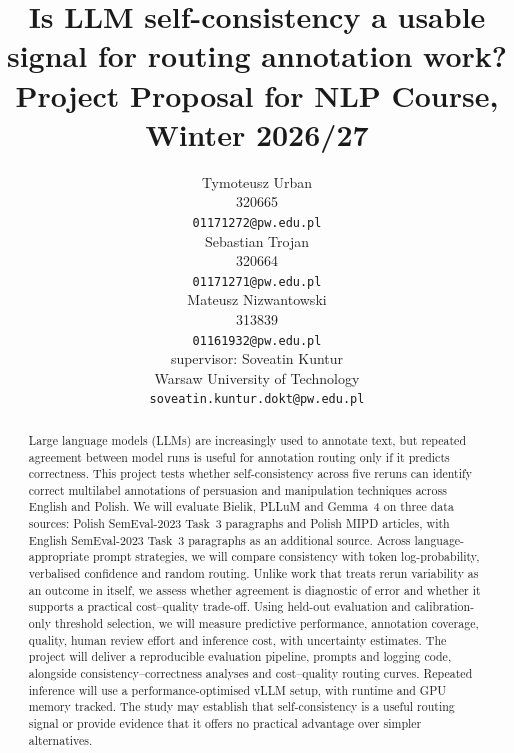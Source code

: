 \documentclass[11pt]{article}
\title{Is LLM self-consistency a usable signal for routing annotation work?\\Project Proposal for NLP Course, Winter 2026/27}
\author{Tymoteusz Urban \\
  320665 \\
  {\tt 01171272@pw.edu.pl} \\\And
  Sebastian Trojan \\
  320664 \\
  {\tt 01171271@pw.edu.pl} \\ \And
  Mateusz Nizwantowski \\
  313839 \\
  {\tt 01161932@pw.edu.pl} \\ \AND
  supervisor: Soveatin Kuntur\\
  Warsaw University of Technology \\
  {\tt soveatin.kuntur.dokt@pw.edu.pl}}
\date{}
\begin{document}
\maketitle

\begin{abstract}
  Large language models (LLMs) are increasingly used to annotate text, but repeated agreement between model runs is useful for annotation routing only if it predicts correctness. This project tests whether self-consistency across five reruns can identify correct multilabel annotations of persuasion and manipulation techniques across English and Polish. We will evaluate Bielik, PLLuM and Gemma~4 on three data sources: Polish SemEval-2023 Task~3 paragraphs and Polish MIPD articles, with English SemEval-2023 Task~3 paragraphs as an additional source. Across language-appropriate prompt strategies, we will compare consistency with token log-probability, verbalised confidence and random routing. Unlike work that treats rerun variability as an outcome in itself, we assess whether agreement is diagnostic of error and whether it supports a practical cost--quality trade-off. Using held-out evaluation and calibration-only threshold selection, we will measure predictive performance, annotation coverage, quality, human review effort and inference cost, with uncertainty estimates. The project will deliver a reproducible evaluation pipeline, prompts and logging code, alongside consistency--correctness analyses and cost--quality routing curves. Repeated inference will use a performance-optimised vLLM setup, with runtime and GPU memory tracked. The study may establish that self-consistency is a useful routing signal or provide evidence that it offers no practical advantage over simpler alternatives.
\end{abstract}
\end{document}
